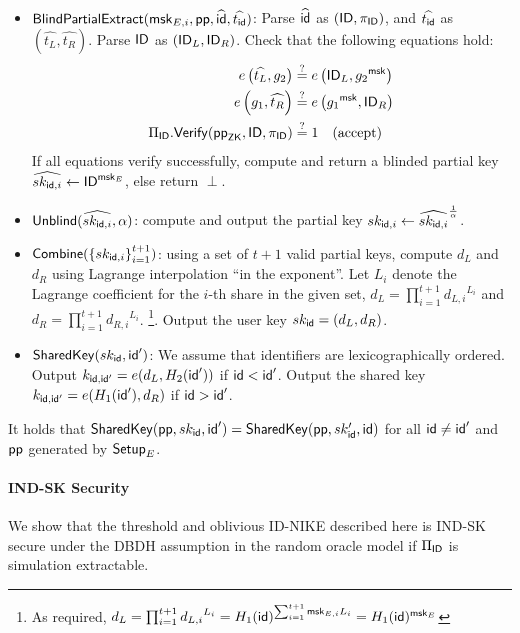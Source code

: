 \begin{definition}
\begin{itemize}
			\item $\mathsf{BlindPartialExtract}(\mathsf{msk}_{E,i}, \mathsf{pp}, \widehat{\mathsf{id}}, \widehat{t_{\mathsf{id}}})$: 
				Parse $\widehat{\mathsf{id}}$ as $(\mathsf{ID}, \pi_{\mathsf{ID}})$, and $\widehat{t_{\mathsf{id}}}$ as $(\widehat{t_L}, \widehat{t_R})$.
				Parse $\mathsf{ID}$ as $(\mathsf{ID}_L, \mathsf{ID}_R)$.
				Check that the following equations hold:
				\begin{equation}
						\begin{aligned}
							e\left(\widehat{t_L}, g_2 \right) &\stackrel{?}{=} e\left(\mathsf{ID}_L, {g_2}^{\mathsf{msk}} \right) \\
							e\left(g_1, \widehat{t_R} \right) &\stackrel{?}{=} e\left({g_1}^{\mathsf{msk}}, \mathsf{ID}_R \right) \\
							\Pi_{\mathsf{ID}}.\mathsf{Verify}(\mathsf{pp}_{\mathsf{ZK}}, \mathsf{ID}, \pi_{\mathsf{ID}}) &\stackrel{?}{=} 1 \quad \text{(accept)}
						\end{aligned}
				\end{equation}
				If all equations verify successfully, compute and return a blinded partial key $\widehat {sk_{\mathsf{id}, i}} \leftarrow \mathsf{ID}^{\mathsf{msk}_E}$, else return $\perp$.
			
			\item $\mathsf{Unblind}(\widehat {sk_{\mathsf{id}, i}}, \alpha)$: compute and output the partial key ${sk_{\mathsf{id}, i}} \leftarrow \widehat {sk_{\mathsf{id}, i}}^{\frac{1}{\alpha}}$.
			
			\item $\mathsf{Combine}(\left\{sk_{\mathsf{id}, i} \right\}_{i =1}^{t+1})$: using a set of $t+1$ valid partial keys, compute $d_L$ and $d_R$ using Lagrange interpolation ``in the exponent''.
			 	Let $L_i$ denote the Lagrange coefficient for the $i$-th share in the given set, $d_L = \prod_{i = 1}^{t+1} {d_{L, i}}^{L_i}$ and $d_R = \prod_{i = 1}^{t+1} {d_{R, i}}^{L_i}$. 
			 	\footnote{As required, $d_L = \prod_{i = 1}^{t+1} {d_{L, i}}^{L_i} = H_1(\mathsf{id})^{\sum_{i = 1}^{t+1}\mathsf{msk}_{E,i}L_i} = H_1(\mathsf{id})^{\mathsf{msk}_E}$}.
			 	Output the user key $sk_{\mathsf{id}} = (d_L, d_R)$.
			
			\item $\mathsf{SharedKey}(sk_{\mathsf{id}}, \mathsf{id}')$: We assume that identifiers are lexicographically ordered. Output $k_{\mathsf{id}, \mathsf{id}'} = e(d_L, H_2(\mathsf{id}'))$ if $\mathsf{id} < \mathsf{id}'$. Output the shared key $k_{\mathsf{id}, \mathsf{id}'} = e(H_1(\mathsf{id}'), d_R)$ if $\mathsf{id} > \mathsf{id}'$.
		\end{itemize}
		It holds that $\mathsf{SharedKey}(\mathsf{pp}, sk_{\mathsf{id}}, \mathsf{id}') = \mathsf{SharedKey}(\mathsf{pp}, sk_{\mathsf{id}}', \mathsf{id})$ for all $\mathsf{id} \neq \mathsf{id}'$ and $\mathsf{pp}$ generated by $\mathsf{Setup}_E$.
	\end{definition}
	
	\paragraph{IND-SK Security} We show that the threshold and oblivious ID-NIKE described here is IND-SK secure under the DBDH assumption in the random oracle model if $\Pi_{\mathsf{ID}}$ is simulation extractable.
	
